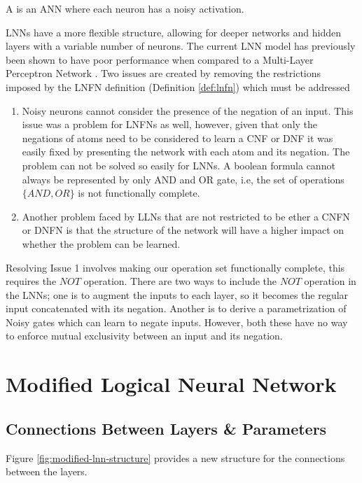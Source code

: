 \begin{definition}
	A  is an ANN where each neuron has a noisy activation.
\end{definition}

LNNs have a more flexible structure, allowing for deeper networks and hidden layers with a variable number of neurons. The current LNN model has previously been shown to have poor performance when compared to a Multi-Layer Perceptron Network \cite{LearningLogicalActivations}. Two issues are created by removing the restrictions imposed by the LNFN definition (Definition \ref{def:lnfn}) which must be addressed 

\begin{enumerate}
	\item Noisy neurons cannot consider the presence of the negation of an input. This issue was a problem for LNFNs as well, however, given that only the negations of atoms need to be considered to learn a CNF or DNF it was easily fixed by presenting the network with each atom and its negation. The problem can not be solved so easily for LNNs. A boolean formula cannot always be represented by only AND and OR gate, i.e, the set of operations $\{AND, OR\}$ is not functionally complete. 
	
	\item Another problem faced by LLNs that are not restricted to be ether a CNFN or DNFN is that the structure of the network will have a higher impact on whether the problem can be learned. 
\end{enumerate}

Resolving Issue 1 involves making our operation set functionally complete, this requires the $NOT$ operation. There are two ways to include the $NOT$ operation in the LNNs; one is to augment the inputs to each layer, so it becomes the regular input concatenated with its negation. Another is to derive a parametrization of Noisy gates which can learn to negate inputs. However, both these have no way to enforce mutual exclusivity between an input and its negation.

\section{Modified Logical Neural Network} \label{sec:modified-lnn}
\subsection{Connections Between Layers \& Parameters}
Figure \ref{fig:modified-lnn-structure} provides a new structure for the connections between the layers.

